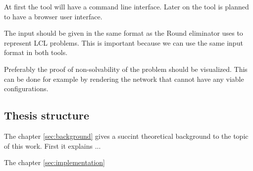 At first the tool will have a command line interface.
Later on the tool is planned to have a browser user interface.

The input should be given in the same format as the Round eliminator uses to represent LCL problems.
This is important because we can use the same input format in both tools.

Preferably the proof of non-solvability of the problem should be visualized.
This can be done for example by rendering the network that cannot have any viable configurations.

\subsection{Thesis structure}
The chapter \ref{sec:background} gives a succint theoretical background to the topic of this work.
First it explains ... %

The chapter \ref{sec:implementation}
